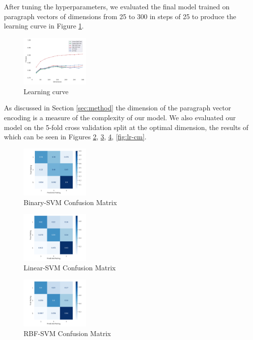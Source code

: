\documentclass[11pt]{article}
\begin{document}
After tuning the hyperparameters, we evaluated the final model trained on paragraph vectors of dimensions from 25 to 300 in steps of 25 to produce the learning curve in Figure \ref{fig:learning-curve}. 
\begin{figure}
	\centering
	\includegraphics[width = 0.3\textwidth]{learning-curves.png}
	\caption{Learning curve}
	\label{fig:learning-curve}
\end{figure}


As discussed in Section \ref{sec:method} the dimension of the paragraph vector encoding is a measure of the complexity of our model. We also evaluated our model on the 5-fold cross validation split at the optimal dimension, the results of which can be seen in Figures \ref{fig:binary-cm}, \ref{fig:linear-cm}, \ref{fig:rbf-cm}, \ref{fig:lr-cm}. 
\begin{figure}
	\centering
	\includegraphics[width = 0.3\textwidth]{fig-binary-cm.png}
	\caption{Binary-SVM Confusion Matrix}
	\label{fig:binary-cm}
\end{figure}

\begin{figure}
	\centering
	\includegraphics[width = 0.3\textwidth]{fig-linear-cm.png}
	\caption{Linear-SVM Confusion Matrix}
	\label{fig:linear-cm}
\end{figure}

\begin{figure}
	\centering
	\includegraphics[width = 0.3\textwidth]{fig-rbf-cm.png}
	\caption{RBF-SVM Confusion Matrix}
	\label{fig:rbf-cm}
\end{figure}
\end{document}

